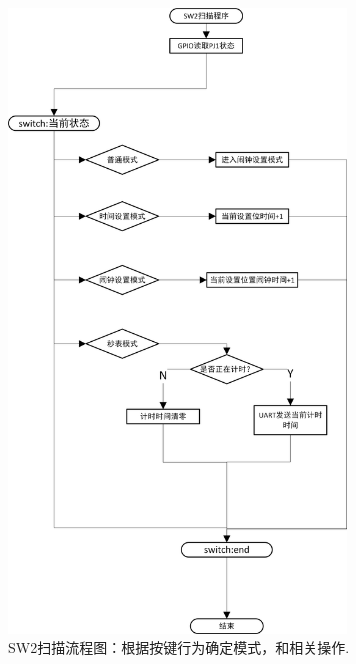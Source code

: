\documentclass[12pt, a4paper, oneside]{ctexart}
\begin{document}
    \begin{figure}[t]
        \centering
        \includegraphics[width=0.8\textwidth]{./img/flowchart_SW2.png}
        \caption{SW2扫描流程图：根据按键行为确定模式，和相关操作.} 
        \label{fig:SW2}
    \end{figure}
\end{document}
